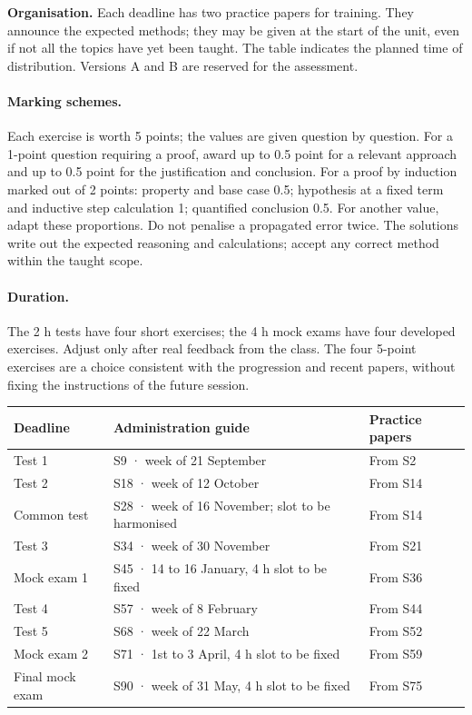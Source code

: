 \textbf{Organisation.} Each deadline has two practice papers for training. They announce the expected methods; they may be given at the start of the unit, even if not all the topics have yet been taught. The table indicates the planned time of distribution. Versions A and B are reserved for the assessment.
\ifmxteacher
\paragraph{Marking schemes.} Each exercise is worth 5 points; the values are given question by question. For a 1-point question requiring a proof, award up to \num{0,5} point for a relevant approach and up to \num{0,5} point for the justification and conclusion. For a proof by induction marked out of 2 points: property and base case \num{0,5}; hypothesis at a fixed term and inductive step calculation 1; quantified conclusion \num{0,5}. For another value, adapt these proportions. Do not penalise a propagated error twice. The solutions write out the expected reasoning and calculations; accept any correct method within the taught scope.
\paragraph{Duration.} The 2 h tests have four short exercises; the 4 h mock exams have four developed exercises. Adjust only after real feedback from the class. The four 5-point exercises are a choice consistent with the progression and recent papers, without fixing the instructions of the future session.
\fi
\begin{longtable}{@{}p{}p{}p{}@{}}\toprule\textbf{Deadline}&\textbf{Administration guide}&\textbf{Practice papers}\\\midrule\endhead


Test 1&S9 · week of 21 September&From S2\\[3pt]

Test 2&S18 · week of 12 October&From S14\\[3pt]

Common test&S28 · week of 16 November; slot to be harmonised&From S14\\[3pt]

Test 3&S34 · week of 30 November&From S21\\[3pt]

Mock exam 1&S45 · 14 to 16 January, 4 h slot to be fixed&From S36\\[3pt]

Test 4&S57 · week of 8 February&From S44\\[3pt]

Test 5&S68 · week of 22 March&From S52\\[3pt]

Mock exam 2&S71 · 1st to 3 April, 4 h slot to be fixed&From S59\\[3pt]

Final mock exam&S90 · week of 31 May, 4 h slot to be fixed&From S75\\[3pt]

\bottomrule\end{longtable}

